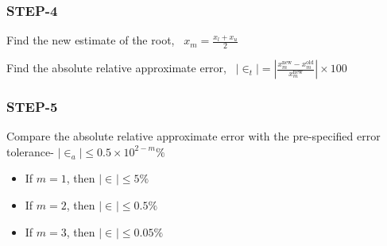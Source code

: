 \subsubsection*{STEP-4}
Find the new estimate of the root, \, $x_m = \frac{x_l+x_u}{2}$

Find the absolute relative approximate error, \, $|\in_t| = \left|\frac{x_m^{\text{new}} - x_m^{\text{old}}}{x_m^{\text{new}}}\right| \times 100$

\subsubsection*{STEP-5}
Compare the absolute relative approximate error with the pre-specified error tolerance-
$|\in_a| \leq 0.5 \times 10^{2-m}\%$

\begin{itemize}[parsep=1ex]
   \item If $m=\text{1}$, then $|\in_{}| \leq \text{5}\%$
   \item If $m=\text{2}$, then $|\in_{}| \leq \text{0.5}\%$
   \item If $m=\text{3}$, then $|\in_{}| \leq \text{0.05}\%$
\end{itemize}